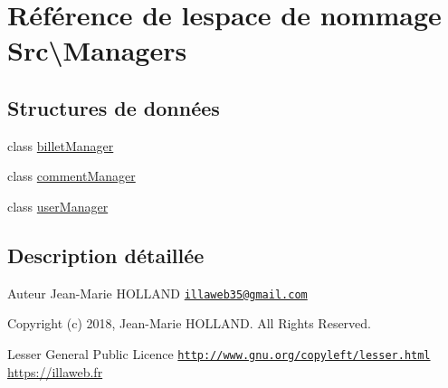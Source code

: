 \hypertarget{namespace_src_1_1_managers}{}\section{Référence de l\textquotesingle{}espace de nommage Src\textbackslash{}Managers}
\label{namespace_src_1_1_managers}
\subsection*{Structures de données}
\begin{DoxyCompactItemize}
\item 
class \hyperlink{class_src_1_1_managers_1_1billet_manager}{billet\+Manager}
\item 
class \hyperlink{class_src_1_1_managers_1_1comment_manager}{comment\+Manager}
\item 
class \hyperlink{class_src_1_1_managers_1_1user_manager}{user\+Manager}
\end{DoxyCompactItemize}


\subsection{Description détaillée}
\begin{DoxyAuthor}{Auteur}
Jean-\/\+Marie H\+O\+L\+L\+A\+ND \href{mailto:illaweb35@gmail.com}{\tt illaweb35@gmail.\+com} 
\end{DoxyAuthor}
\begin{DoxyCopyright}{Copyright}
(c) 2018, Jean-\/\+Marie H\+O\+L\+L\+A\+ND. All Rights Reserved.
\end{DoxyCopyright}
Lesser General Public Licence \href{http://www.gnu.org/copyleft/lesser.html}{\tt http\+://www.\+gnu.\+org/copyleft/lesser.\+html} \hyperlink{}{https\+://illaweb.\+fr}